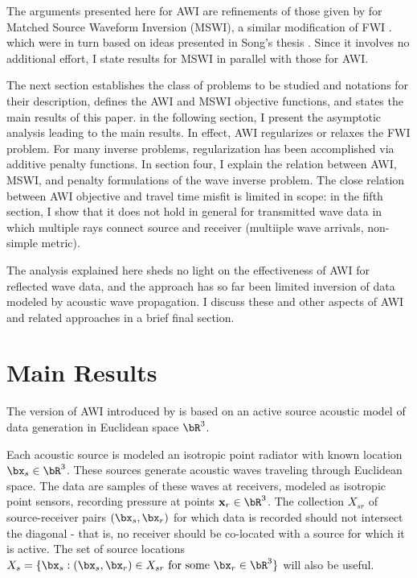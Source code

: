 The arguments presented here for AWI are refinements of those given by
\cite{HuangSymes:Geo17} for Matched Source Waveform Inversion (MSWI),
a similar modification of FWI
\cite[]{HuangSymes2015SEG,HuangSymes:Geo17}. which were in turn based
on ideas presented in Song's thesis \cite[]{Song:94}. Since it
involves no additional effort, I state results for MSWI in parallel
with those for AWI.

The next section establishes the class of problems to be studied and notations
for their description, defines the AWI and MSWI objective functions,
and states the main results of this paper. in the following section, I present the
asymptotic analysis leading to the main results. In
effect, AWI regularizes or relaxes the FWI problem. For many inverse
problems, regularization has been accomplished via additive penalty
functions. In section four, I explain the relation between AWI, MSWI, and 
penalty formulations of the wave inverse problem. The close relation
between AWI objective and travel time misfit is limited in scope: in
the fifth section, I show that it does not hold in general for
transmitted wave data in which multiple rays connect source and
receiver (multiiple wave arrivals, non-simple metric).

The analysis explained here sheds no light on the effectiveness of AWI
for reflected wave data, and the approach has so far been limited
inversion of data modeled by acoustic wave propagation. I discuss
these and other aspects of AWI and related approaches in a brief final
section.

\section{Main Results}

The version of AWI introduced by \cite{Warner:16} is based on an
active source acoustic model of data generation in Euclidean space
$\bR^3$. 

Each acoustic source is modeled an isotropic point radiator
with known location $\bx_s\in \bR^3$. These
sources generate acoustic waves traveling through Euclidean space. The
data are samples of these waves at receivers, modeled as isotropic
point sensors, recording pressure at points
${\bf x}_r \in \bR^3$. The collection $X_{sr}$ of source-receiver pairs
$(\bx_s,\bx_r)$ for which data is recorded should not intersect the
diagonal - that is, no receiver should be co-located with a source for
which it is active. The set of source locations $X_s = \{\bx_s: (\bx_s,\bx_r) \in X_{sr}
\mbox{ for some } \bx_r \in \bR^3\}$ will also be useful.

